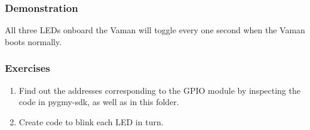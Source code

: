 \subsubsection{Demonstration}
All three LEDs onboard the Vaman will toggle every one second when the Vaman
boots normally.

\subsubsection{Exercises}
\begin{enumerate}
    \item Find out the addresses corresponding to the GPIO module by inspecting
    the code in pygmy-sdk, as well as in this folder.
    \item Create code to blink each LED in turn.
\end{enumerate}